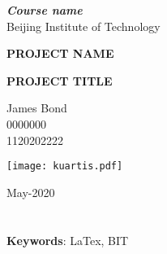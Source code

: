 \documentclass[11pt,english, openany,a4paper]{book}
\begin{document}

\begin{titlepage}
	\clearpage\thispagestyle{empty}
	\centering
	\vspace{1cm}

	{\normalsize \textbf{\textit{Course name}} \\ 
		Beijing Institute of Technology \par}
		\vspace{5.5cm}
	{\Huge \textbf{PROJECT NAME}} \\
	\vspace{0.6cm}
	{\large \textbf{PROJECT TITLE} \par}
	\vspace{4.3cm}
	{\normalsize James Bond \\ %
	             0000000 \\
	             1120202222\par}
	\vspace{2.6cm}
    
    \centering \texttt{[image: kuartis.pdf]}\\
    \vspace{0.5cm}

		
	{\normalsize May-2020 \par}
	
	\pagebreak

\end{titlepage}

{\hypersetup{linkcolor=black}
	\tableofcontents{}
}

\mainmatter

\chapter*{}
\lipsum[5]

\vspace{0.5cm}
\noindent\textbf{Keywords}: 
LaTex, BIT
\end{document}
